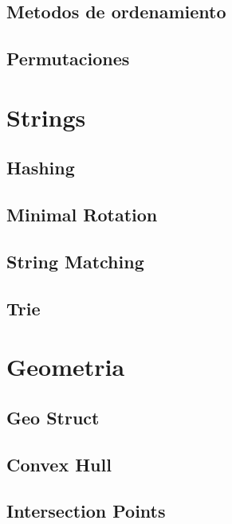 \subsection{Metodos de ordenamiento}
\raggedbottom
\hrulefill
\subsection{Permutaciones}
\raggedbottom
\hrulefill

\section{Strings}
\subsection{Hashing}
\raggedbottom
\hrulefill
\subsection{Minimal Rotation}
\raggedbottom
\hrulefill
\subsection{String Matching}
\raggedbottom
\hrulefill
\subsection{Trie}
\raggedbottom
\hrulefill

\section{Geometria}
\subsection{Geo Struct}
\raggedbottom
\hrulefill
\subsection{Convex Hull}
\raggedbottom
\hrulefill
\subsection{Intersection Points}
\raggedbottom
\hrulefill
